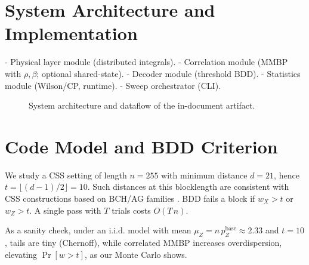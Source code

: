 \documentclass{article}
\newcommand{\nexact}[1]{#1}
\newcommand{\simn}{255}
\newcommand{\simt}{10}
\begin{document}
\section{System Architecture and Implementation}\label{sec:system-arch}
- Physical layer module (distributed integrals).
- Correlation module (MMBP with \(\rho,\beta\); optional shared-state).
- Decoder module (threshold BDD).
- Statistics module (Wilson/CP, runtime).
- Sweep orchestrator (CLI).

\begin{figure}[ht]
\centering
\begin{adjustbox}{max width=\linewidth}
\end{adjustbox}
\caption{System architecture and dataflow of the in-document artifact.}
\label{fig:arch}

\end{figure}

\section{Code Model and BDD Criterion}
We study a CSS setting of length \(n=\nexact{\simn}\) with minimum distance \(d=21\), hence \(t=\lfloor(d-1)/2\rfloor=\nexact{\simt}\). Such distances at this blocklength are consistent with CSS constructions based on BCH/AG families \cite{Ashikhmin2001PRA,ChenLing2008TIT}. BDD fails a block if \(w_X>t\) or \(w_Z>t\). A single pass with \(T\) trials costs \(O(T\,n)\).

As a sanity check, under an i.i.d. model with mean \( \mu_Z = n\,p_Z^{\text{base}} \approx 2.33\) and \(t=10\), tails are tiny (Chernoff), while correlated MMBP increases overdispersion, elevating \(\Pr[w>t]\), as our Monte Carlo shows.
\end{document}
